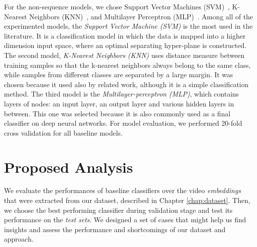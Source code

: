 For the non-sequence models, we chose Support Vector Machines (SVM)~\cite{cortes1995support}, K-Nearest Neighbors (KNN)~\cite{peterson2009k}, and Multilayer Perceptron (MLP)~\cite{haykin2009neural}.
Among all of the experimented models, the \textit{Support Vector Machine (SVM)} is the most used in the literature.
It is a classification model in which the data is mapped into a higher dimension input space, where an optimal separating hyper-plane is constructed.
The second model, \textit{K-Nearest Neighbors (KNN)} uses distance measure between training samples so that the k-nearest neighbors always belong to the same class, while samples from different classes are separated by a large margin. 
It was chosen because it used also by related work, although it is a simple classification method.
The third model is the \textit{Multilayer-perceptron (MLP)}, which contains layers of nodes: an input layer, an output layer and various hidden layers in between. 
This one was selected because it is also commonly used as a final classifier on deep neural networks.  
For model evaluation, we performed 20-fold cross validation for all baseline models.
%
\section{Proposed Analysis}\label{sec:experiments}

We evaluate the performances of baseline classifiers over the video \textit{embeddings} that were extracted from our dataset, described in Chapter \ref{chap:dataset}. Then, we choose the best performing classifier during validation stage and test its performance on the \textit{test sets}.  
We designed a set of cases that might help us find insights and assess the performance and shortcomings of our dataset and approach.  

